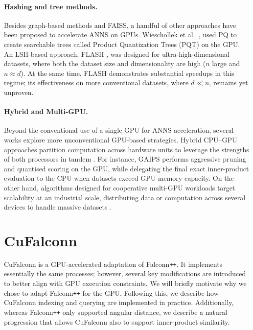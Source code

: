 \documentclass{article}
\newcommand{\cf}{CuFalconn\xspace}
\newcommand{\fpp}{Falconn\texttt{++}\xspace}
\begin{document}
\paragraph{Hashing and tree methods.}

Besides graph-based methods and FAISS, a handful of other approaches have been proposed to accelerate ANNS on GPUs. Wieschollek et al.\ \cite{wieschollek2016efficient}, used PQ to create searchable trees called Product Quantization Trees (PQT) on the GPU. An LSH-based approach, FLASH \cite{wang2018randomized}, was designed for ultra-high-dimensional datasets, where both the dataset size and dimensionality are high ($n$ large and $n \approx d$). At the same time, FLASH demonstrates substantial speedups in this regime; its effectiveness on more conventional datasets, where $d \ll n$, remains yet unproven.

\paragraph{Hybrid and Multi-GPU.}
Beyond the conventional use of a single GPU for ANNS acceleration, several works explore more unconventional GPU-based strategies. Hybrid CPU–GPU approaches partition computation across hardware units to leverage the strengths of both processors in tandem \cite{xiang2019accelerating,tian2024fusionanns}. For instance, GAIPS \cite{xiang2019accelerating} performs aggressive pruning and quantised scoring on the GPU, while delegating the final exact inner-product evaluation to the CPU when datasets exceed GPU memory capacity. On the other hand, algorithms designed for cooperative multi-GPU workloads target scalability at an industrial scale, distributing data or computation across several devices to handle massive datasets \cite{johnson2019billion,kato2012multi,groh2022ggnn}.

\newpage

\section{\cf}

\cf is a GPU-accelerated adaptation of \fpp. It implements essentially the same processes; however, several key modifications are introduced to better align with GPU execution constraints. We will briefly motivate why we chose to adapt \fpp for the GPU. Following this, we describe how \cf indexing and querying are implemented in practice. Additionally, whereas \fpp only supported angular distance, we describe a natural progression that allows \cf also to support inner-product similarity. 
\end{document}
